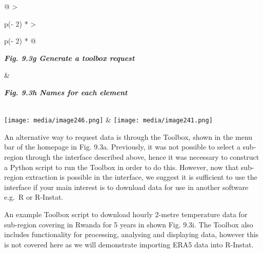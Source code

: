\documentclass[
  letterpaper,
  DIV=11,
  numbers=noendperiod]{scrreprt}
\begin{document}
\begin{longtable}[]{@{}
  >{\raggedright\arraybackslash}p{(\columnwidth - 2\tabcolsep) * }
  >{\raggedright\arraybackslash}p{(\columnwidth - 2\tabcolsep) * }@{}}
\toprule\noalign{}
\begin{minipage}[b]{\linewidth}\raggedright
\textbf{\emph{Fig. 9.3g Generate a toolbox request}}
\end{minipage} & \begin{minipage}[b]{\linewidth}\raggedright
\textbf{\emph{Fig. 9.3h Names for each element}}
\end{minipage} \\
\midrule\noalign{}
\endhead
\bottomrule\noalign{}
\endlastfoot
\texttt{[image: media/image246.png]} &
\texttt{[image: media/image241.png]} \\
\end{longtable}

An alternative way to request data is through the Toolbox, shown in the
menu bar of the homepage in Fig. 9.3a. Previously, it was not possible
to select a sub-region through the interface described above, hence it
was necessary to construct a Python script to run the Toolbox in order
to do this. However, now that sub-region extraction is possible in the
interface, we suggest it is sufficient to use the interface if your main
interest is to download data for use in another software e.g.~R or
R-Instat.

An example Toolbox script to download hourly 2-metre temperature data
for sub-region covering in Rwanda for 5 years in shown Fig. 9.3i. The
Toolbox also includes functionality for processing, analysing and
displaying data, however this is not covered here as we will demonstrate
importing ERA5 data into R-Instat.
\end{document}
